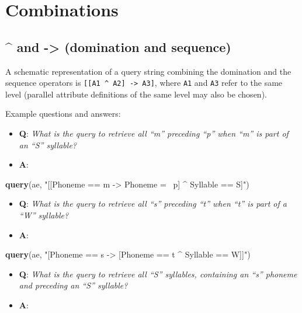 \documentclass[]{book}
\newenvironment{Shaded}{\begin{snugshade}}{\end{snugshade}}
\newcommand{\KeywordTok}[1]{\textcolor[rgb]{0.13,0.29,0.53}{\textbf{#1}}}
\newcommand{\NormalTok}[1]{#1}
\newcommand{\StringTok}[1]{\textcolor[rgb]{0.31,0.60,0.02}{#1}}
\providecommand{\tightlist}{%
  \setlength{\itemsep}{0pt}\setlength{\parskip}{0pt}}
\begin{document}
\hypertarget{combinations}{%
\section{Combinations}\label{combinations}}

\hypertarget{and---domination-and-sequence}{%
\subsection{\^{} and -\textgreater{} (domination and sequence)}\label{and---domination-and-sequence}}

A schematic representation of a query string combining the domination and the sequence operators is \texttt{{[}{[}A1\ \^{}\ A2{]}\ -\textgreater{}\ A3{]}}, where \texttt{A1} and \texttt{A3} refer to the same level (parallel attribute definitions of the same level may also be chosen).

Example questions and answers:

\begin{itemize}
\tightlist
\item
  \textbf{Q}: \emph{What is the query to retrieve all ``m'' preceding ``p'' when ``m'' is part of an ``S'' syllable?}
\item
  \textbf{A}:
\end{itemize}

\begin{Shaded}
\begin{Highlighting}[]
\KeywordTok{query}\NormalTok{(ae, }\StringTok{"[[Phoneme == m -> Phoneme =~ p] ^ Syllable == S]"}\NormalTok{)}
\end{Highlighting}
\end{Shaded}

\begin{itemize}
\tightlist
\item
  \textbf{Q}: \emph{What is the query to retrieve all ``s'' preceding ``t'' when ``t'' is part of a ``W'' syllable?}
\item
  \textbf{A}:
\end{itemize}

\begin{Shaded}
\begin{Highlighting}[]
\KeywordTok{query}\NormalTok{(ae, }\StringTok{"[Phoneme == s -> [Phoneme == t ^ Syllable == W]]"}\NormalTok{)}
\end{Highlighting}
\end{Shaded}

\begin{itemize}
\tightlist
\item
  \textbf{Q}: \emph{What is the query to retrieve all ``S'' syllables, containing an ``s'' phoneme and preceding an ``S'' syllable?}
\item
  \textbf{A}:
\end{itemize}
\end{document}
